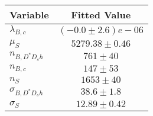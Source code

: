 \begin{tabular}[t]{lc}
\hline
Variable &Fitted Value\\
\hline\hline
$\lambda_{B,c}$&$(-0.0\pm2.6)e-06$\\
\hline
$\mu_S$&$5279.38\pm0.46$\\
\hline
$n_{B, D^* D_s h}$&$761\pm40$\\
\hline
$n_{B,c}$&$147\pm53$\\
\hline
$n_S$&$1653\pm40$\\
\hline
$\sigma_{B, D^* D_s h}$&$38.6\pm1.8$\\
\hline
$\sigma_S$&$12.89\pm0.42$\\
\hline
\end{tabular}